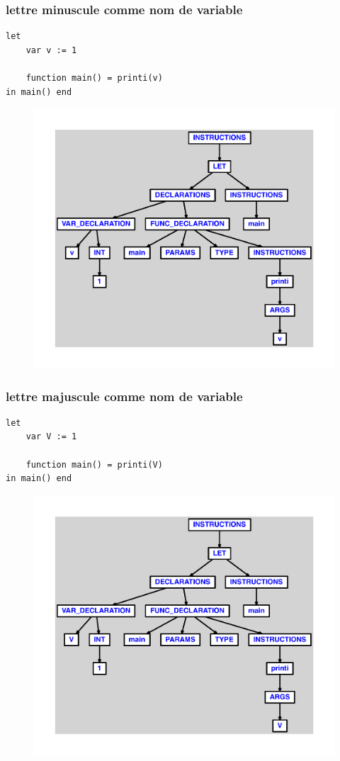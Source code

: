 \documentclass{article}
\begin{document}
\subsubsection{lettre minuscule comme nom de variable}
\begin{lstlisting}
let
	var v := 1

	function main() = printi(v)
in main() end
\end{lstlisting}
\newpage
\begin{figure}[H]
\centering
\includegraphics[max width=\textwidth]{ast/ast_315.pdf}
\end{figure}
\newpage
\subsubsection{lettre majuscule comme nom de variable}
\begin{lstlisting}
let
	var V := 1

	function main() = printi(V)
in main() end
\end{lstlisting}
\newpage
\begin{figure}[H]
\centering
\includegraphics[max width=\textwidth]{ast/ast_316.pdf}
\end{figure}
\newpage
\end{document}
